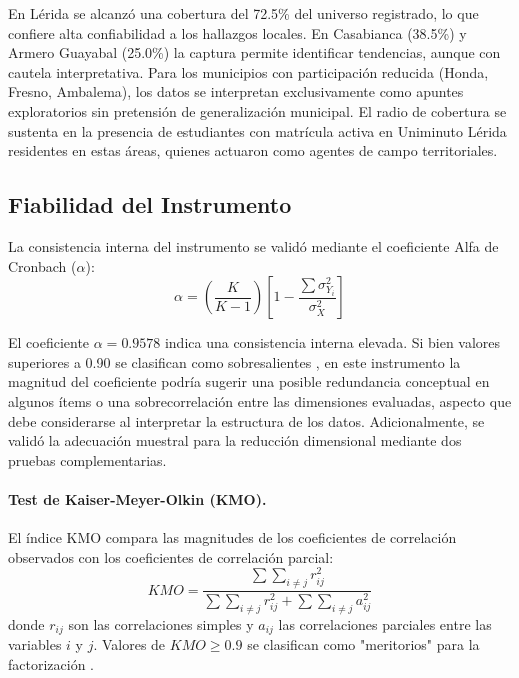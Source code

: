 \documentclass[11pt,a4paper]{article}
\begin{document}
\par
En Lérida se alcanzó una cobertura del 72.5\% del universo registrado, lo que confiere alta confiabilidad a los hallazgos locales. En Casabianca (38.5\%) y Armero Guayabal (25.0\%) la captura permite identificar tendencias, aunque con cautela interpretativa. Para los municipios con participación reducida (Honda, Fresno, Ambalema), los datos se interpretan exclusivamente como apuntes exploratorios sin pretensión de generalización municipal. El radio de cobertura se sustenta en la presencia de estudiantes con matrícula activa en Uniminuto Lérida residentes en estas áreas, quienes actuaron como agentes de campo territoriales.

\subsection{Fiabilidad del Instrumento}
La consistencia interna del instrumento se validó mediante el coeficiente Alfa de Cronbach ($\alpha$):
\begin{equation}
    \alpha = \left( \frac{K}{K - 1} \right)\left[ 1 - \frac{\sum\sigma_{Y_{i}}^{2}}{\sigma_{X}^{2}} \right]
\end{equation}

El coeficiente $\alpha = 0.9578$ indica una consistencia interna elevada. Si bien valores superiores a 0.90 se clasifican como sobresalientes \citep{mcneish2018}, en este instrumento la magnitud del coeficiente podría sugerir una posible redundancia conceptual en algunos ítems o una sobrecorrelación entre las dimensiones evaluadas, aspecto que debe considerarse al interpretar la estructura de los datos. Adicionalmente, se validó la adecuación muestral para la reducción dimensional mediante dos pruebas complementarias.

\paragraph{Test de Kaiser-Meyer-Olkin (KMO).}
El índice KMO \citep{goretzko2021} compara las magnitudes de los coeficientes de correlación observados con los coeficientes de correlación parcial:
\begin{equation}
    KMO = \frac{\sum\sum_{i \neq j}^{}r_{ij}^{2}}{\sum\sum_{i \neq j}^{}r_{ij}^{2} + \sum\sum_{i \neq j}^{}a_{ij}^{2}}
\end{equation}
donde $r_{ij}$ son las correlaciones simples y $a_{ij}$ las correlaciones parciales entre las variables $i$ y $j$. Valores de $KMO \geq 0.9$ se clasifican como "meritorios" para la factorización \citep{goretzko2021}.
\end{document}
